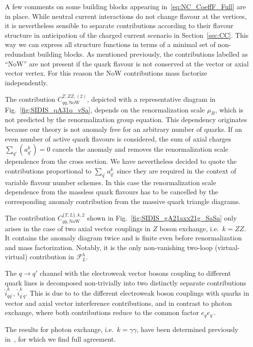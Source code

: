 \documentclass[11pt,a4paper]{article}
\newcommand{\Fcal}{\mathcal{F}}
\newcommand{\qp}{{q^\prime}}
\newcommand{\ih}{\hat{i}}
\newcommand{\NoW}{\mathrm{NoW}}
\begin{document}
A few comments on some building blocks appearing in~\eqref{eq:NC_CoeffF_Full} are in place.
%
While neutral current interactions do not change flavour at the vertices, it is nevertheless sensible to separate contributions according to their flavour structure in anticipation of the charged current scenario in Section~\ref{sec:CC}.
This way we can express all structure functions in terms of a minimal set of non-redundant building blocks.
As mentioned previously, the contributions labelled as ``$\NoW$'' are not present if the quark flavour is not conserved at the vector or axial vector vertex.
For this reason the $\NoW$ contributions mass factorize independently.


The contribution $C^{T,ZZ,(2)}_{qq,\NoW}$, depicted with a representative diagram in Fig.~\ref{fig:SIDIS_qA31q_vSa}, depends on the renormalization scale $\mu_R$, which is not predicted by the renormalization group equation.
This dependency originates because our theory is not anomaly free for an arbitrary number of quarks.
If an even number of active quark flavours is considered, the sum of axial charges $\sum_{q'} \left(a^k_{q'} \right) = 0$ cancels the anomaly and removes the renormalization scale dependence from the cross section.
We have nevertheless decided to quote the contributions proportional to $\sum_{q^\prime} a^k_{q'}$ since they are required in the context of variable flavour number schemes.
In this case the renormalization scale  dependence from the massless quark flavours has to be cancelled by the corresponding anomaly contribution from the massive quark triangle diagrams.

The contribution $C_{gg,\NoW}^{\{T,L\},k,2}$ shown in Fig.~\ref{fig:SIDIS_gA21axx21g_SaSa} only arises in the case of two axial vector couplings in $Z$ boson exchange, i.e.\ $k=ZZ$.
It contains the anomaly diagram twice and is finite even before renormalization and mass factorization.
Notably, it is the only non-vanishing two-loop (virtual-virtual) contribution in $\Fcal^h_L$.

The $q\to q'$ channel with the electroweak vector bosons coupling to different quark lines is decomposed non-trivially into two distinctly separate contributions $\ih_{q\qp}^k$, $\ih_{\qp q}^k$.
This is due to to the different electroweak boson couplings with quarks in vector and axial vector interference contributions, and in contrast to photon exchange, where both contributions reduce to the common factor $e_q e_\qp$.

The results for photon exchange, i.e.\ $k=\gamma\gamma$, have been determined previously in~\cite{Goyal:2023zdi,Bonino:2024qbh,Goyal:2024emo}, for which we find full agreement.
\end{document}
